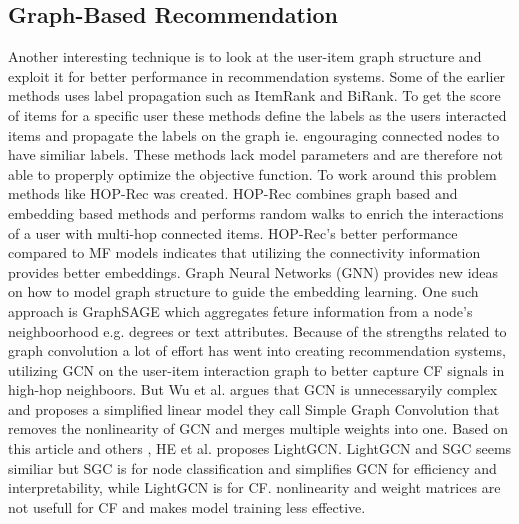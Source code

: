 \subsection{Graph-Based Recommendation}
Another interesting technique is to look at the user-item graph structure and exploit it for better performance in recommendation systems.
Some of the earlier methods uses label propagation such as ItemRank\cite{ItemRank} and BiRank\cite{BiRank}.
To get the score of items for a specific user these methods define the labels as the users interacted items and propagate the labels on the graph ie. engouraging connected nodes to have similiar labels.
These methods lack model parameters and are therefore not able to properply optimize the objective function\cite{NGCF_2019}.
To work around this problem methods like HOP-Rec \cite{HOP_Rec} was created.
HOP-Rec combines graph based and embedding based methods and performs random walks to enrich the interactions of a user with multi-hop connected items.
HOP-Rec's better performance compared to MF models indicates that utilizing the connectivity information provides better embeddings.
Graph Neural Networks (GNN) provides new ideas on how to model graph structure to guide the embedding learning.
One such approach is GraphSAGE\cite{IND_REP_LEA} which aggregates feture information from a node's neighboorhood e.g. degrees or text attributes.
Because of the strengths related to graph convolution a lot of effort has went into creating recommendation systems\cite{NGCF_2019,GC_MC,Priceaware}, utilizing GCN on the user-item interaction graph to better capture CF signals in high-hop neighboors.
But Wu et al. \cite{SGCN} argues that GCN is unnecessaryily complex and proposes a simplified linear model they call Simple Graph Convolution that removes the nonlinearity of GCN and merges multiple weights into one.
Based on this article and others \cite{PRE_PROP,DEEP_GCN}, HE et al. \cite{lightgcn} proposes LightGCN.
LightGCN and SGC seems similiar but SGC is for node classification and simplifies GCN for efficiency and interpretability, while LightGCN is for CF.
nonlinearity and weight matrices are not usefull for CF and makes model training less effective.
